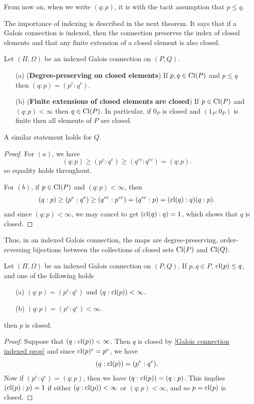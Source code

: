 From now on, when we write $(q:p)$, it is with the tacit assumption that $p\leq q$.\par
The importance of indexing is described in the next theorem. It says that if a Galois connection is indexed, then the connection preserves the index of closed elements and that any finite extension of a closed element is also closed.
\begin{theorem}\label{Galois connection indexed prop}
Let $(\Pi,\Omega)$ be an indexed Galois connection on $(P,Q)$.
\begin{itemize}
\item[(a)] (\textbf{Degree-preserving on closed elements}) If $p,q\in\mathrm{Cl}(P)$ and $p\leq q$ then $(q:p)=(p^e:q^e)$.
\item[(b)] (\textbf{Finite extensions of closed elements are closed}) If $p\in\mathrm{Cl}(P)$ and $(q:p)<\infty$ then $q\in\mathrm{Cl}(P)$. In particular, if $0_P$ is closed and $(1_P:0_P)$ is finite then all elements of $P$ are closed.
\end{itemize}
A similar statement holds for $Q$.
\end{theorem}
\begin{proof}
For $(a)$, we have
\[(q:p)\geq(p^e:q^e)\geq(q^{ec}:q^{ec})=(q:p).\]
so equality holds throughout.\par
For $(b)$, if $p\in\mathrm{Cl}(P)$ and $(q:p)<\infty$, then
\[(q:p)\geq(p^e:q^e)\geq(q^{ec}:p^{ec})=(q^{ec}:p)=(\mathrm{cl}(q):q)(q:p).\]
and since $(q:p)<\infty$, we may cancel to get $(\mathrm{cl}(q):q)=1$, which shows that $q$ is closed.
\end{proof}
Thus, in an indexed Galois connection, the maps are degree-preserving, order-reversing bijections between the collections of closed sets $\mathrm{Cl}(P)$ and $\mathrm{Cl}(Q)$.\par
\begin{proposition}\label{Galois connection degree argument}
Let $(\Pi,\Omega)$ be an indexed Galois connection on $(P,Q)$. If $p,q\in P$, $\mathrm{cl}(p)\leq q$, and one of the following holds
\begin{itemize}
\item[(a)] $(q:p)=(p^e:q^e)$ and $(q:\mathrm{cl}(p))<\infty$.
\item[(b)] $(q:p)=(p^e:q^e)<\infty$.
\end{itemize}
then $p$ is closed.
\end{proposition}
\begin{proof}
Suppose that $(q:\mathrm{cl}(p))<\infty$. Then $q$ is closed by \cref{Galois connection indexed prop} and since $\mathrm{cl}(p)^e=p^e$, we have
\[(q:\mathrm{cl}(p))=(p^e:q^e).\]
Now if $(p^e:q^e)=(q:p)$, then we have $(q:\mathrm{cl}(p))=(q:p)$. This implies $(\mathrm{cl}(p):p)=1$ if either $(q:\mathrm{cl}(p))<\infty$ or $(q:p)<\infty$, and so $p=\mathrm{cl}(p)$ is closed.
\end{proof}
